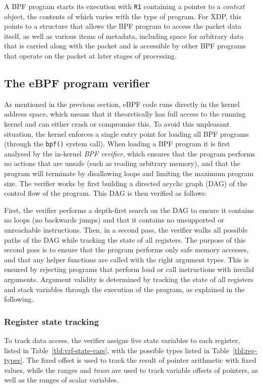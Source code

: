\documentclass[10pt,sigconf]{acmart}
\begin{document}
A BPF program starts its execution with \texttt{R1} containing a pointer to a \emph{context}
object, the contents of which varies with the type of program. For XDP, this
points to a structure that allows the BPF program to access the packet data
itself, as well as various items of metadata, including space for arbitrary data
that is carried along with the packet and is accessible by other BPF programs
that operate on the packet at later stages of processing.


\subsection{The eBPF program verifier}
\label{sec:bpf-verifier}
As mentioned in the previous section, eBPF code runs directly in the kernel
address space, which means that it theoretically has full access to the running
kernel and can either crash or compromise this. To avoid this unpleasant
situation, the kernel enforces a single entry point for loading all BPF programs
(through the \texttt{bpf()} system call). When loading a BPF program it is first
analysed by the in-kernel \emph{BPF verifier}, which ensures that the program
performs no actions that are unsafe (such as reading arbitrary memory), and that
the program will terminate by disallowing loops and limiting the maximum program
size. The verifier works by first building a directed acyclic graph (DAG) of the
control flow of the program. This DAG is then verified as follows:

First, the verifier performs a depth-first search on the DAG to ensure it
contains no loops (no backwards jumps) and that it contains no unsupported or
unreachable instructions. Then, in a second pass, the verifier walks all
possible paths of the DAG while tracking the state of all registers. The purpose
of this second pass is to ensure that the program performs only safe memory
accesses, and that any helper functions are called with the right argument
types. This is ensured by rejecting programs that perform load or call
instructions with invalid arguments. Argument validity is determined by tracking
the state of all registers and stack variables through the execution of the
program, as explained in the following.

\subsubsection{Register state tracking}
\label{sec:reg-state}
To track data access, the verifier assigns five state variables to each
register, listed in Table \ref{tbl:vrf-state-vars}, with the possible types listed in
Table \ref{tbl:reg-types}. The fixed offset is used to track the result of pointer
arithmetic with fixed values, while the ranges and \emph{tnum} are used to track
variable offsets of pointers, as well as the ranges of scalar variables.
\end{document}
